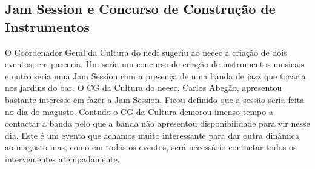 
\subsection{Jam Session e Concurso de Construção de Instrumentos}

O Coordenador Geral da Cultura do \acrshort{nedf} sugeriu ao \acrshort{neeec} a criação de dois eventos, em parceria. Um seria um concurso de criação de instrumentos musicais e outro seria uma Jam Session com a presença de uma banda de jazz que tocaria nos jardins do bar. O CG da Cultura do \acrshort{neeec}, Carlos Abegão, apresentou bastante interesse em fazer a Jam Session. Ficou definido que a sessão seria feita no dia do magusto. Contudo o CG da Cultura demorou imenso tempo a contactar a banda pelo que a banda não apresentou disponibilidade para vir nesse dia. Este é um evento que achamos muito interessante para dar outra dinâmica ao magusto mas, como em todos os eventos, será necessário contactar todos os intervenientes atempadamente.
